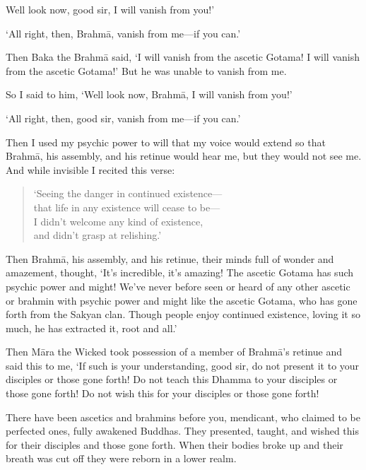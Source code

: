 \documentclass[12pt,openany]{book}%
\begin{document}
Well look now, good sir, I will vanish from you!’ 

‘All right, then, \textsanskrit{Brahmā}, vanish from me—if you can.’ 

Then Baka the \textsanskrit{Brahmā} said, ‘I will vanish from the ascetic Gotama! I will vanish from the ascetic Gotama!’ But he was unable to vanish from me. 

So I said to him, ‘Well look now, \textsanskrit{Brahmā}, I will vanish from you!’ 

‘All right, then, good sir, vanish from me—if you can.’ 

Then I used my psychic power to will that my voice would extend so that \textsanskrit{Brahmā}, his assembly, and his retinue would hear me, but they would not see me. And while invisible I recited this verse: 

\begin{verse}%
‘Seeing the danger in continued existence—\\
that life in any existence will cease to be—\\
I didn’t welcome any kind of existence, \\
and didn’t grasp at relishing.’ 

%
\end{verse}

Then \textsanskrit{Brahmā}, his assembly, and his retinue, their minds full of wonder and amazement, thought, ‘It’s incredible, it’s amazing! The ascetic Gotama has such psychic power and might! We’ve never before seen or heard of any other ascetic or brahmin with psychic power and might like the ascetic Gotama, who has gone forth from the Sakyan clan. Though people enjoy continued existence, loving it so much, he has extracted it, root and all.’ 

Then \textsanskrit{Māra} the Wicked took possession of a member of \textsanskrit{Brahmā}’s retinue and said this to me, ‘If such is your understanding, good sir, do not present it to your disciples or those gone forth! Do not teach this Dhamma to your disciples or those gone forth! Do not wish this for your disciples or those gone forth! 

There have been ascetics and brahmins before you, mendicant, who claimed to be perfected ones, fully awakened Buddhas. They presented, taught, and wished this for their disciples and those gone forth. When their bodies broke up and their breath was cut off they were reborn in a lower realm. 
\end{document}
